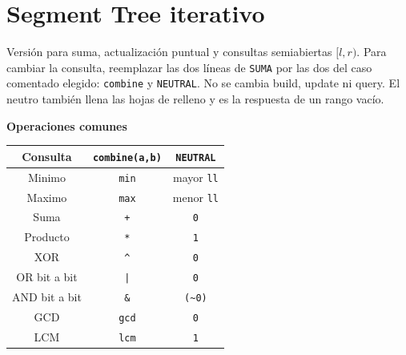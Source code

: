 \section{Segment Tree iterativo}

Versi\'on para suma, actualizaci\'on puntual y consultas semiabiertas $[l,r)$.
Para cambiar la consulta, reemplazar las dos l\'ineas de \texttt{SUMA} por
las dos del caso comentado elegido: \texttt{combine} y \texttt{NEUTRAL}.
No se cambia build, update ni query. El neutro tambi\'en llena las hojas de
relleno y es la respuesta de un rango vac\'io.

\textbf{Operaciones comunes}
\begin{center}
\begin{tabular}{|c|c|c|}
\hline
Consulta & \texttt{combine(a,b)} & \texttt{NEUTRAL} \\
\hline
Minimo & \texttt{min} & mayor \texttt{ll} \\
Maximo & \texttt{max} & menor \texttt{ll} \\
Suma & \texttt{+} & \texttt{0} \\
Producto & \texttt{*} & \texttt{1} \\
XOR & \texttt{\^} & \texttt{0} \\
OR bit a bit & \texttt{|} & \texttt{0} \\
AND bit a bit & \texttt{\&} & \texttt{(\textasciitilde 0)} \\
GCD & \texttt{gcd} & \texttt{0} \\
LCM & \texttt{lcm} & \texttt{1} \\
\hline
\end{tabular}
\end{center}


